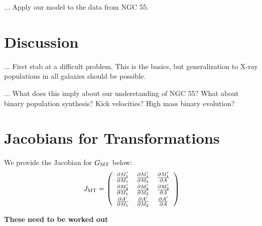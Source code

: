 \documentclass[12pt, preprint]{aastex}
\begin{document}
... Apply our model to the data from NGC 55. 

\section{Discussion}

... First stab at a difficult problem. This is the basics, but generalization to X-ray populations in all galaxies should be possible.

... What does this imply about our understanding of NGC 55? What about binary population synthesis? Kick velocities? High mass binary evolution?



\appendix

\section{Jacobians for Transformations}

We provide the Jacobian for $G_{\rm MT}$ below:
\[  J_{\rm MT} = \left( \begin{array}{ccc}
\frac{\partial M_1'}{\partial M_1} & \frac{\partial M_1'}{\partial M_2} & \frac{\partial M_1'}{\partial A}  \\[0.3em]
\frac{\partial M_2'}{\partial M_1}  & \frac{\partial M_2'}{\partial M_2} & \frac{\partial M_2'}{\partial A} \\[0.3em]
\frac{\partial A'}{\partial M_1} & \frac{\partial A'}{\partial M_2} & \frac{\partial A'}{\partial A}  \end{array} \right)\]

{\bf These need to be worked out}
\end{document}
